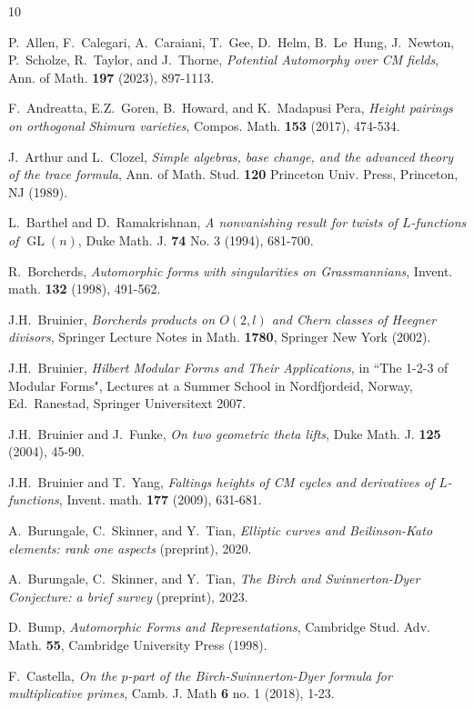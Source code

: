 \documentclass{amsart}
\theoremstyle{definition}
\begin{document}
\begin{thebibliography}{10}

 P.~Allen, F.~Calegari, A.~Caraiani, T.~Gee, D.~Helm, B.~Le~Hung, J.~Newton, P.~Scholze, R.~Taylor, and J.~Thorne, {\it{Potential Automorphy over CM fields}}, Ann. of Math. {\bf{197}} (2023), 897-1113. 

 F.~Andreatta, E.Z.~Goren, B.~Howard, and K.~Madapusi Pera, {\it{Height pairings on orthogonal Shimura varieties}}, Compos. Math. {\bf{153}} (2017), 474-534.

 J.~Arthur and L.~Clozel, {\it{ Simple algebras, base change, and the advanced theory of the trace formula}},  Ann. of Math. Stud. {\bf{120}} Princeton Univ. Press, Princeton, NJ (1989).

 L.~Barthel and D.~Ramakrishnan, {\it{A nonvanishing result for twists of $L$-functions of $\operatorname{GL}(n)$}}, Duke Math. J. {\bf{74}} No. 3 (1994), 681-700.

 R.~Borcherds, {\it{Automorphic forms with singularities on Grassmannians}}, Invent. math. {\bf{132}} (1998), 491-562.

 J.H.~Bruinier, {\it{Borcherds products on $O(2, l)$ and Chern classes of Heegner divisors}}, Springer Lecture Notes in Math. {\bf{1780}}, Springer New York (2002).

 J.H.~Bruinier, {\it{Hilbert Modular Forms and Their Applications}}, in ``The 1-2-3 of Modular Forms", Lectures at a Summer School in Nordfjordeid, Norway, Ed.~Ranestad, Springer Universitext 2007.

 J.H.~Bruinier and J.~Funke, {\it{On two geometric theta lifts}}, Duke Math. J. {\bf{125}} (2004), 45-90.

 J.H.~Bruinier and T.~Yang, {\it{Faltings heights of CM cycles and derivatives of $L$-functions}}, Invent. math. {\bf{177}} (2009), 631-681.

 A.~Burungale, C.~Skinner, and Y.~Tian, {\it{Elliptic curves and Beilinson-Kato elements: rank one aspects}} (preprint), 2020.

 A.~Burungale, C.~Skinner, and Y.~Tian, {\it{The Birch and Swinnerton-Dyer Conjecture: a brief survey}} (preprint), 2023.

 D.~Bump, {\it{Automorphic Forms and Representations}}, Cambridge Stud. Adv. Math. {\bf{55}}, Cambridge University Press (1998).

 F.~Castella, {\it{On the $p$-part of the Birch-Swinnerton-Dyer formula for multiplicative primes}}, Camb. J. Math {\bf{6}} no. 1 (2018), 1-23.


\end{thebibliography}
\end{document}
